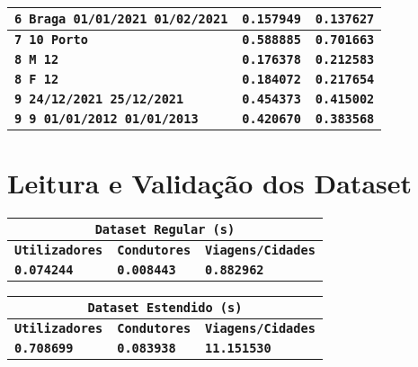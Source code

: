 \documentclass[12pt,a4paper]{report}
\begin{document}
{\begin{tabularx}{\textwidth} { 
  | >{\centering\arraybackslash}X
  | >{\centering\arraybackslash}X
  | >{\centering\arraybackslash}X | }
 \hline
 \texttt{\textbf{6 Braga 01/01/2021 01/02/2021}} & \vspace{-5pt}\texttt{\textbf{0.157949}} & \texttt{\textbf{0.137627}} \\
 \hline
 \texttt{\textbf{7 10 Porto}} & \texttt{\textbf{0.588885}} & \texttt{\textbf{0.701663}} \\
 \hline
 \texttt{\textbf{8 M 12}} & \texttt{\textbf{0.176378}} & \texttt{\textbf{0.212583}} \\
 \hline
 \texttt{\textbf{8 F 12}} & \texttt{\textbf{0.184072}} & \texttt{\textbf{0.217654}} \\
 \hline
 \texttt{\textbf{9 24/12/2021 25/12/2021}} & \vspace{-5pt}\texttt{\textbf{0.454373}} & \texttt{\textbf{0.415002}} \\
 \hline
 \texttt{\textbf{9 9 01/01/2012 01/01/2013}} & \vspace{-5pt}\texttt{\textbf{0.420670}} & \texttt{\textbf{0.383568}} \\
 \hline
 \end{tabularx}
}


\section{Leitura e Validação dos Dataset}

{
\setlength\arrayrulewidth{1pt}

\begin{center}
    \begin{tabular}{ |p{4.73cm}|p{4.73cm}|p{4.73cm}|  }
        \hline
        \multicolumn{3}{|c|}{\textbf{\texttt{Dataset Regular (s)}}} \\
        \hline
        \centering\textbf{\texttt{Utilizadores}} & \hfil \textbf{\texttt{Condutores}} & \hfil \textbf{\texttt{Viagens/Cidades}} \\
        \hline
        \centering\textbf{\texttt{0.074244}} & \hfil \texttt{\textbf{0.008443}} & \hfil \texttt{\textbf{0.882962}}\\
        \hline
    \end{tabular}
\end{center}


\begin{center}
    \begin{tabular}{ |p{4.73cm}|p{4.73cm}|p{4.73cm}|  }
        \hline
        \multicolumn{3}{|c|}{\textbf{\texttt{Dataset Estendido (s)}}} \\
        \hline
        \centering\textbf{\texttt{Utilizadores}} & \hfil \textbf{\texttt{Condutores}} & \hfil \textbf{\texttt{Viagens/Cidades}} \\
        \hline
        \centering\textbf{\texttt{0.708699}} & \hfil \texttt{\textbf{0.083938}} & \hfil \texttt{\textbf{11.151530}}\\
        \hline
    \end{tabular}
\end{center}
}
\end{document}
